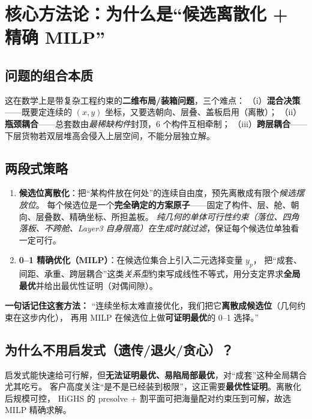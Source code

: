 \documentclass[11pt]{ctexart}
\begin{document}
\section{核心方法论：为什么是“候选离散化 + 精确 MILP”}

\subsection{问题的组合本质}
这在数学上是带复杂工程约束的\textbf{二维布局/装箱问题}，三个难点：
（i）\textbf{混合决策}——既要定连续的 $(x,y)$ 坐标，又要选朝向、层叠、盖板启用（离散）；
（ii）\textbf{瓶颈耦合}——总套数由\emph{最稀缺构件}封顶，6 个构件互相牵制；
（iii）\textbf{跨层耦合}——下层货物若双层堆高会侵入上层空间，不能分层独立解。

\subsection{两段式策略}
\begin{enumerate}[leftmargin=1.8em,itemsep=2pt]
  \item \textbf{候选位离散化}：把“某构件放在何处”的连续自由度，预先离散成有限个\emph{候选摆放位}。
  每个候选位是一个\textbf{完全确定的方案原子}——固定了构件、层、舱、朝向、层叠数、精确坐标、所担盖板。
  \emph{纯几何的单体可行性约束（落位、四角落板、不跨舱、Layer3 自身限高）在生成时就过滤}，保证每个候选位单独看一定可行。
  \item \textbf{0--1 精确优化（MILP）}：在候选位集合上引入二元选择变量 $y_p$，
  把“成套、间距、承重、跨层耦合”这类\emph{关系型}约束写成线性不等式，用分支定界求\textbf{全局最优}并给出最优性证明（对偶间隙）。
\end{enumerate}

\begin{key}\textbf{一句话记住这套方法：}
“连续坐标太难直接优化，我们把它\textbf{离散成候选位}（几何约束在这步内化），
再用 MILP 在候选位上做\textbf{可证明最优}的 0--1 选择。”
\end{key}

\subsection{为什么不用启发式（遗传/退火/贪心）？}
启发式能快速给可行解，但\textbf{无法证明最优、易陷局部最优}，对“成套”这种全局耦合尤其吃亏。
客户高度关注“是不是已经装到极限”，这正需要\textbf{最优性证明}。离散化后规模可控，
HiGHS 的 presolve + 割平面可把海量配对约束压到可解，故选 MILP 精确求解。
\end{document}
